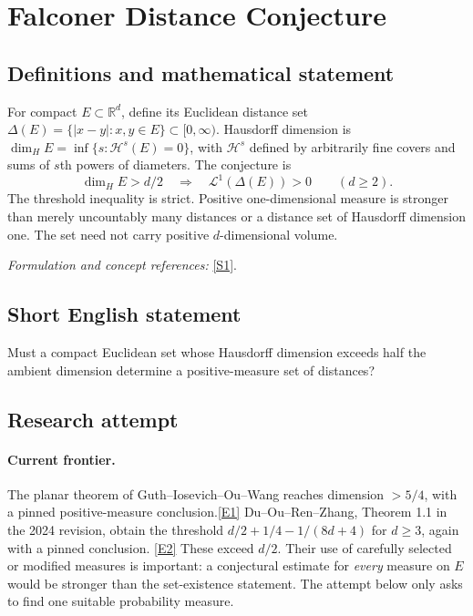 \documentclass[11pt,a4paper]{article}
\newcommand{\R}{\mathbb{R}}
\newcommand{\sref}[2]{\hyperlink{source:#1:#2}{[S#2]}}
\newcommand{\eref}[2]{\hyperlink{extra:#1:#2}{[E#2]}}
\newif\ifshowcatalogue
\newcommand{\cataloguescope}[1]{\ifshowcatalogue
 \paragraph{Exact scope in the supplied catalogue.}
 \begin{quote}\small #1\end{quote}\fi}
\begin{document}
\setcounter{section}{0}
\clearpage
\section*{\texorpdfstring{Falconer Distance Conjecture}{Falconer Distance Conjecture}}\label{30001063}
\subsection{Definitions and mathematical statement}
For compact $E\subset\R^d$, define its Euclidean distance set
$\Delta(E)=\{|x-y|:x,y\in E\}\subset[0,\infty)$. Hausdorff dimension is
$\dim_H E=\inf\{s:\mathcal H^s(E)=0\}$, with $\mathcal H^s$ defined by arbitrarily fine covers and sums of $s$th powers of diameters. The conjecture is
\[
 \dim_H E>d/2\quad\Longrightarrow\quad \mathcal L^1(\Delta(E))>0
 \qquad(d\ge2).
\]
The threshold inequality is strict. Positive one-dimensional measure is stronger than merely uncountably many distances or a distance set of Hausdorff dimension one. The set need not carry positive $d$-dimensional volume.
\par\smallskip\textit{Formulation and concept references:} \sref{30001063}{1}.
\cataloguescope{Prove or disprove that for every integer d>=2 and every compact set E in R\textasciicircum{}d with Hausdorff dimension greater than d/2, the distance set Delta(E)=\{|x-y|: x,y in E\} has positive one-dimensional Lebesgue measure.}
\subsection{Short English statement}
Must a compact Euclidean set whose Hausdorff dimension exceeds half the ambient dimension determine a positive-measure set of distances?
\subsection{Research attempt}

\paragraph{Current frontier.}
The planar theorem of Guth--Iosevich--Ou--Wang reaches dimension $>5/4$,
with a pinned positive-measure conclusion.\eref{30001063}{1}
Du--Ou--Ren--Zhang, Theorem 1.1 in the 2024 revision, obtain the threshold
$d/2+1/4-1/(8d+4)$ for $d\ge3$, again with a pinned conclusion.
\eref{30001063}{2} These exceed $d/2$. Their use of carefully selected or modified
measures is important: a conjectural estimate for \emph{every} measure on
$E$ would be stronger than the set-existence statement. The attempt below
only asks to find one suitable probability measure.
\end{document}
